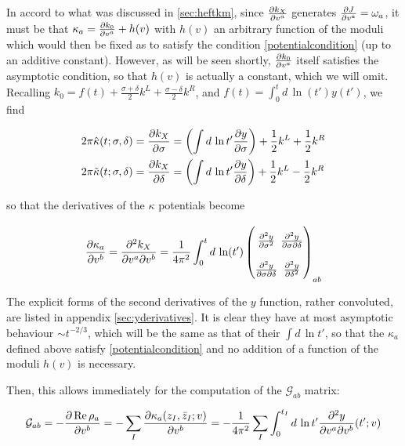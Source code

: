 In accord to what was discussed in \ref{sec:heftkm}, since $\frac{\partial k_X}{\partial v^a}$ generates $\frac{\partial J}{\partial v^a} = \omega_a$, it must be that $\kappa_a = \frac{\partial k_0}{\partial v^a} + h(v)$ with $h(v)$ an arbitrary function of the moduli which would then be fixed as to satisfy the condition \eqref{potentialcondition} (up to an additive constant). However, as will be seen shortly, $\frac{\partial k_0}{\partial v^a}$ itself satisfies the asymptotic condition, so that $h(v)$ is actually a constant, which we will omit.\\

Recalling $k_0 = f(t) + \frac{\sigma+\delta}{2} k^L + \frac{\sigma-\delta}{2} k^R$, and $f(t) = \int_0^t d \, \ln(t') y(t')$, we find

\begin{align}
 	2\pi \hat\kappa(t;\sigma,\delta) =	\frac{\partial k_X}{\partial\sigma} & = \left( \int d\, \ln t' \frac{\partial y}{\partial\sigma} \right) + \frac{1}2 k^L + \frac{1}2 k^R \\
	2\pi \tilde\kappa(t;\sigma,\delta) =  \frac{\partial k_X}{\partial\delta} & = \left( \int d\, \ln t' \frac{\partial y}{\partial\delta} \right) + \frac{1}2 k^L - \frac{1}2 k^R
	\label{}
\end{align}

so that the derivatives of the $\kappa$ potentials become

\begin{equation}
\arraycolsep=1.4pt\def\arraystretch{2.2}
\pder{\kappa_a}{v^b} = \frac{\partial^2 k_X}{\partial v^a \partial v^b} = \frac{1}{4 \pi^2} \int_0^t d\, \ln(t')
	\begin{pmatrix}
		\frac{\partial^2 y}{\partial \sigma^2} & \frac{\partial^2 y}{\partial \sigma \partial \delta} \\
		\frac{\partial^2 y}{\partial \sigma\partial \delta} & \frac{\partial^2 y}{\partial \delta^2}
	\end{pmatrix}_{ab}
	\label{}
\end{equation}

The explicit forms of the second derivatives of the $y$ function, rather convoluted, are listed in appendix \ref{sec:yderivatives}. It is clear they have at most asymptotic behaviour $\sim t^{-2/3}$, which will be the same as that of their $\int d\,\ln t'$, so that the $\kappa_a$ defined above satisfy \eqref{potentialcondition} and no addition of a function of the moduli $h(v)$ is necessary.

Then, this allows immediately for the computation of the $\mathcal{G}_{ab}$ matrix:

\begin{equation}
	\mathcal{G}_{ab} = - \frac{\partial\operatorname{Re} \rho_a}{\partial v^b}  = - \sum_I \frac{\partial \kappa_a(z_I,\bar z_I; v)}{\partial v^b} = - \frac{1}{4\pi^2} \sum_I \int_0^{t_I} d\,\ln t' \frac{\partial^2 y}{\partial v^a \partial v^b} (t' ; v)
	\label{Gfinal}
\end{equation}

